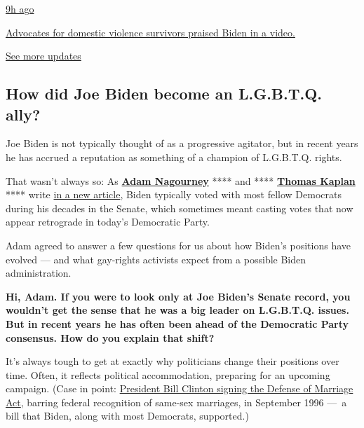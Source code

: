 \href{https://www.nytimes3xbfgragh.onion/live/2020/08/19/us/dnc-convention-election?action=click\&pgtype=Article\&state=default\&region=MAIN_CONTENT_1\&context=storylines_live_updates\#advocates-for-domestic-violence-survivors-praised-biden-in-a-video}{9h
ago}

\href{https://www.nytimes3xbfgragh.onion/live/2020/08/19/us/dnc-convention-election?action=click\&pgtype=Article\&state=default\&region=MAIN_CONTENT_1\&context=storylines_live_updates\#advocates-for-domestic-violence-survivors-praised-biden-in-a-video}{Advocates
for domestic violence survivors praised Biden in a video.}

\href{https://www.nytimes3xbfgragh.onion/live/2020/08/19/us/dnc-convention-election?action=click\&pgtype=Article\&state=default\&region=MAIN_CONTENT_1\&context=storylines_live_updates}{See
more updates}

\hypertarget{how-did-joe-biden-become-an-lgbtq-ally}{%
\subsection{How did Joe Biden become an L.G.B.T.Q.
ally?}\label{how-did-joe-biden-become-an-lgbtq-ally}}

Joe Biden is not typically thought of as a progressive agitator, but in
recent years he has accrued a reputation as something of a champion of
L.G.B.T.Q. rights.

That wasn't always so: As
\textbf{\href{https://www.nytimes3xbfgragh.onion/by/adam-nagourney}{Adam
Nagourney}} **** and ****
\textbf{\href{https://www.nytimes3xbfgragh.onion/by/thomas-kaplan}{Thomas
Kaplan}} **** write
\href{https://www.nytimes3xbfgragh.onion/2020/06/21/us/politics/biden-gay-rights-lgbt.html}{in
a new article}, Biden typically voted with most fellow Democrats during
his decades in the Senate, which sometimes meant casting votes that now
appear retrograde in today's Democratic Party.

Adam agreed to answer a few questions for us about how Biden's positions
have evolved --- and what gay-rights activists expect from a possible
Biden administration.

\textbf{Hi, Adam. If you were to look only at Joe Biden's Senate record,
you wouldn't get the sense that he was a big leader on L.G.B.T.Q.
issues. But in recent years he has often been ahead of the Democratic
Party consensus. How do you explain that shift?}

It's always tough to get at exactly why politicians change their
positions over time. Often, it reflects political accommodation,
preparing for an upcoming campaign. (Case in point:
\href{https://www.nytimes3xbfgragh.onion/2013/03/26/us/politics/bill-clintons-decision-and-regret-on-defense-of-marriage-act.html}{President
Bill Clinton signing the Defense of Marriage Act}, barring federal
recognition of same-sex marriages, in September 1996 ---~a bill that
Biden, along with most Democrats, supported.)

